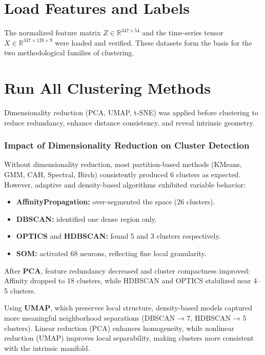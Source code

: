 \documentclass[12pt,a4paper]{report}
\begin{document}
\section{Load Features and Labels}
The normalized feature matrix \( Z \in \mathbb{R}^{347 \times 54} \) and the time-series tensor
\( X \in \mathbb{R}^{347 \times 128 \times 9} \) were loaded and verified.
These datasets form the basis for the two methodological families of clustering.

\section{Run All Clustering Methods}
Dimensionality reduction (PCA, UMAP, t-SNE) was applied before clustering to reduce redundancy,
enhance distance consistency, and reveal intrinsic geometry.

\subsubsection*{Impact of Dimensionality Reduction on Cluster Detection}
Without dimensionality reduction, most partition-based methods (KMeans, GMM, CAH, Spectral, Birch)
consistently produced 6 clusters as expected.
However, adaptive and density-based algorithms exhibited variable behavior:
\begin{itemize}[label=--, leftmargin=1.2cm, itemsep=2pt]
    \item \textbf{AffinityPropagation:} over-segmented the space (26 clusters).
    \item \textbf{DBSCAN:} identified one dense region only.
    \item \textbf{OPTICS} and \textbf{HDBSCAN:} found 5 and 3 clusters respectively.
    \item \textbf{SOM:} activated 68 neurons, reflecting fine local granularity.
\end{itemize}

After \textbf{PCA}, feature redundancy decreased and cluster compactness improved:
Affinity dropped to 18 clusters, while HDBSCAN and OPTICS stabilized near 4–5 clusters.

Using \textbf{UMAP}, which preserves local structure, density-based models captured
more meaningful neighborhood separations (DBSCAN → 7, HDBSCAN → 5 clusters).
Linear reduction (PCA) enhances homogeneity, while nonlinear reduction (UMAP) improves local separability,
making clusters more consistent with the intrinsic manifold.
\end{document}
